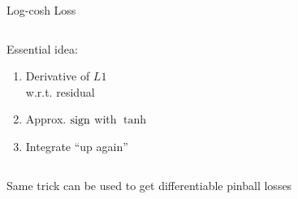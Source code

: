 \documentclass[11pt,compress,t,notes=noshow, xcolor=table]{beamer}
\begin{document}
\begin{vbframe}{Log-cosh Loss }

\begin{columns}

\begin{column}{0.4\textwidth}

\vspace{1cm}

Essential idea:
\begin{enumerate}
    \item Derivative of $L1$ \\
    w.r.t. residual 
    \item Approx. $\operatorname{sign}$ with $\tanh$
    \item Integrate ``up again'' 
\end{enumerate}

\end{column}

\begin{column}{0.6\textwidth}


\begin{figure}
      \centering
    \end{figure}

\end{column}

\end{columns}

\vfill

Same trick can be used to get differentiable pinball losses

\end{vbframe}
\end{document}
